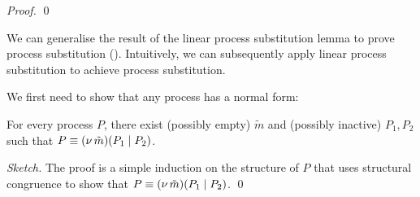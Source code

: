 \begin{proof}
\begin{comment}
			\hby{\bactinp{t}{\abs{\widetilde{x}}{\binp{t'}{y} \appl{y}{\widetilde{x}}}}}
			&\Delta_2''& \proves& \newsp{\widetilde{m_2'}}{Q_1' \Par \appl{x}{\widetilde{m}} \subst{\abs{\widetilde{x}}{\binp{t'}{y} \appl{y}{\widetilde{x}}}}{x}} \\
		\end{array}
	\]
%
%
	\noi From here the proof is similar with the previous case.
\end{comment}
\qed
\end{proof}

\noindent
We can generalise the result of the linear process substitution lemma
to prove process substitution ().
Intuitively, we can subsequently apply linear process substitution
to achieve process substitution.


We first need to show that any process has a normal form:
\begin{lemma}
	\label{app:lem:nomral_form}
	For every process $P$, there exist (possibly empty) $\tilde{m}$
	and (possibly inactive) $P_1, P_2$ such that
	$P \equiv (\nu\, \tilde{m})(P_1 \;|\; P_2)$.
\end{lemma}

\begin{proof}[Sketch]
	The proof is a simple induction on the structure
	of $P$ that uses structural congruence to show that
	$P \equiv (\nu\, \tilde{m})(P_1 \;|\; P_2)$. 
\qed
\end{proof}




